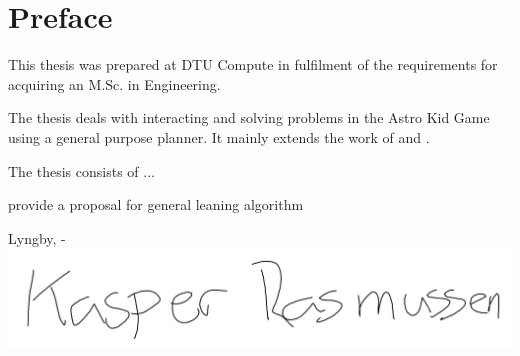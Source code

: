 \chapter{Preface}

This thesis was prepared at DTU Compute in fulfilment of the requirements for acquiring an M.Sc. in Engineering.

The thesis deals with interacting and solving problems in the Astro Kid Game using a general purpose planner. It mainly extends the work of \cite{Action-Schemas} and \cite{jacobsen2015a}.

The thesis consists of ...

provide a proposal for general leaning algorithm
\vspace{20mm}
\begin{center}
    \hspace{20mm} Lyngby, \thesishandin-\thesisyear
    \vspace{5mm}
    \newline
    \includegraphics[scale=0.18]{figures/Signature}
\end{center}
\begin{flushright}
    \thesisauthor
\end{flushright}
